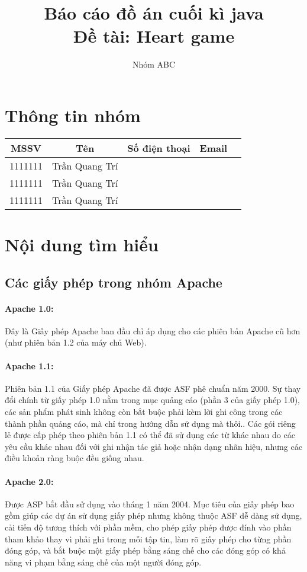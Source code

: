 \documentclass[12pt]{article}
\author{Nhóm ABC}
\begin{document}
\title{Báo cáo đồ án cuối kì java\\Đề tài:  Heart game}
\maketitle
\tableofcontents
\pagebreak
\section{Thông tin nhóm}
\begin{tabularx}{\textwidth}{|c|c|c|cX|}
\hline
MSSV & Tên & Số điện thoại & Email \\ \hline
1111111 & Trần Quang Trí &  &  \\
1111111  & Trần Quang Trí &  &  \\
1111111  & Trần Quang Trí &  &  \\
\hline
\end{tabularx}

\section{Nội dung tìm hiểu}

\subsection{Các giấy phép trong nhóm Apache}

\paragraph{Apache 1.0:}
Đây là Giấy phép Apache ban đầu chỉ áp dụng cho các phiên bản Apache cũ hơn (như phiên bản 1.2 của máy chủ Web).

\paragraph{Apache 1.1:}
Phiên bản 1.1 của Giấy phép Apache đã được ASF phê chuẩn năm 2000. Sự thay đổi chính từ giấy phép 1.0 nằm trong mục quảng cáo (phần 3 của giấy phép 1.0), các sản phẩm phát sinh không còn bắt buộc phải kèm lời ghi công trong các thành phần quảng cáo, mà chỉ trong hướng dẫn sử dụng mà thôi.. Các gói riêng lẻ được cấp phép theo phiên bản 1.1 có thể đã sử dụng các từ khác nhau do các yêu cầu khác nhau đối với ghi nhận tác giả hoặc nhận dạng nhãn hiệu, nhưng các điều khoản ràng buộc đều giống nhau. 

\paragraph{Apache 2.0:}
Được ASP bắt đầu sử dụng vào tháng 1 năm 2004. Mục tiêu của giấy phép bao gồm giúp các dự án sử dụng giấy phép nhưng không thuộc ASF dễ dàng sử dụng, cải tiến độ tương thích với phần mềm, cho phép giấy phép được đính vào phần tham khảo thay vì phải ghi trong mỗi tập tin, làm rõ giấy phép cho từng phần đóng góp, và bắt buộc một giấy phép bằng sáng chế cho các đóng góp có khả năng vi phạm bằng sáng chế của một người đóng góp.
\end{document}
